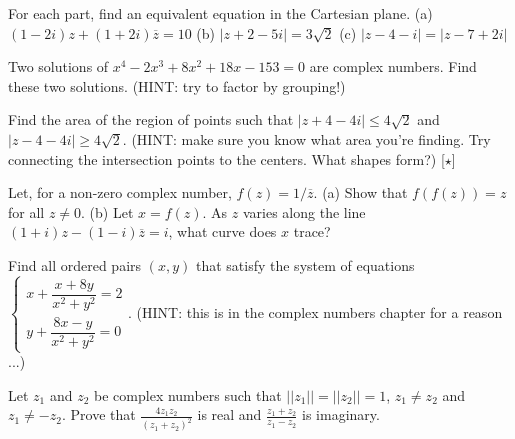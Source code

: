 \documentclass[lang=en,11pt]{elegantbook}
\begin{document}
\begin{challengeset}
\item For each part, find an equivalent equation in the Cartesian plane.  \newline 
(a) $(1-2i)z+(1+2i)\overline{z}=10$ \newline 
(b) $|z+2-5i|=3\sqrt{2}$ \newline 
(c) $|z-4-i|=|z-7+2i|$ \vspace{3mm}

\item Two solutions of $x^4-2x^3+8x^2+18x-153=0$ are complex numbers.  Find these two solutions.  (HINT: try to factor by grouping!) \vspace{3mm}

\item Find the area of the region of points such that $|z+4-4i|\leq 4\sqrt{2}$ and $|z-4-4i|\geq 4\sqrt{2}$.  (HINT: make sure you know what area you're finding.  Try connecting the intersection points to the centers.  What shapes form?) [$\star$]\vspace{3mm}

\item Let, for a non-zero complex number, $f(z)=1/\overline{z}$.  \newline 
(a) Show that $f(f(z))=z$ for all $z\neq 0$.  \newline 
(b) Let $x=f(z)$.  As $z$ varies along the line $(1+i)z-(1-i)\overline{z}=i$, what curve does $x$ trace?\vspace{3mm}

\item Find all ordered pairs $(x,y)$ that satisfy the system of equations $\begin{cases} x+\dfrac{x+8y}{x^2+y^2}=2 \\ y+\dfrac{8x-y}{x^2+y^2}=0 \end{cases}$.  (HINT: this is in the complex numbers chapter for a reason ...)\vspace{3mm}

\item Let $z_1$ and $z_2$ be complex numbers such that $||z_1||=||z_2||=1$, $z_1\neq z_2$ and $z_1\neq -z_2$.  Prove that $\displaystyle \frac{4z_1z_2}{\left(z_1+z_2\right)^2}$ is real and $\displaystyle \frac{z_1+z_2}{z_1-z_2}$ is imaginary.
\end{challengeset}
\end{document}
